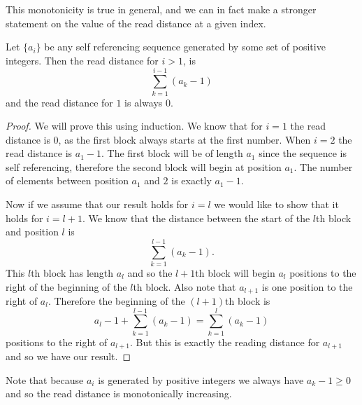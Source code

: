 \documentclass[runningheads,a4paper]{llncs}
\begin{document}
This monotonicity is true in general, and we can in fact make a stronger statement on the value of the read distance at a given index.
\begin{lemma} 
\label{readdistformula}
Let $\{a_i\}$ be any self referencing sequence generated by some set of positive integers. Then the read distance for $i>1$, is 
\begin{equation*}
\sum_{k=1}^{i-1}( a_k - 1)
\end{equation*} 
and the read distance for $1$ is always 0.
\end{lemma}
\begin{proof}
We will prove this using induction. We know that for $i=1$ the read distance is $0$, as the first block always starts at the first number. When $i=2$ the read distance is $a_1-1$. The first block will be of length $a_1$ since the sequence is self referencing, therefore the second block will begin at position $a_1$. The number of elements between position $a_1$ and $2$ is exactly $a_1 -1$.

Now if we assume that our result holds for $i=l$ we would like to show that it holds for $i=l+1$. We know that the distance between the start of the $l$th block and position $l$ is 
\begin{equation*}
\sum_{k=1}^{l-1}( a_k - 1).
\end{equation*} 
This $l$th block has length $a_l$ and so the $l+1$th block will begin $a_l$ positions to the right of the beginning of the $l$th block. Also note that $a_{l+1}$ is one position to the right of $a_l$. Therefore the beginning of the $(l+1)$th block is 
\begin{equation*}
a_l-1 + \sum_{k=1}^{l-1} (a_k-1) = \sum_{k=1}^{l} (a_k-1)
\end{equation*} 
positions to the right of $a_{l+1}$. But this is exactly the reading distance for $a_{l+1}$ and so we have our result.
\end{proof}
Note that because $a_i$ is generated by positive integers we always have $a_k-1\geq 0$ and so the read distance is monotonically increasing. 

\end{document}
